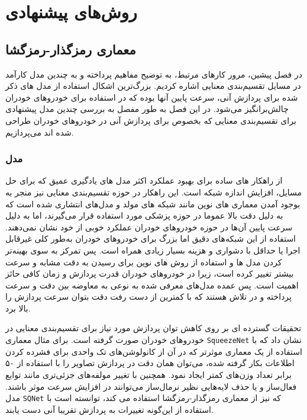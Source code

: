 \chapter{روش‌های پیشنهادی}

\section{معماری رمزگذار-رمزگشا}

در فصل پیشین، مرور کار‌های مرتبط، به توضیح مفاهیم پرداخته و به چندین مدل کارآمد در مسایل تقسیم‌بندی معنایی اشاره کردیم. بزرگ‌ترین اشکال استفاده از مدل های ذکر شده برای پردازش آنی، سرعت پایین آنها بوده که در استفاده برای خودرو‌های خودران چالش‌برانگیز می‌شود. در این فصل به طور مفصل به بررسی چندین مدل پیشنهادی برای تقسیم‌بندی معنایی که بخصوص برای پردازش آنی در خودرو‌های خودران طراحی شده اند می‌پردازیم.

\subsection{مدل }

از راهکار های ساده برای بهبود عملکرد اکثر مدل های یادگیری عمیق که برای حل مسایل، افزایش اندازه شبکه است. این راهکار در حوزه تقسیم‌بندی معنایی نیز منجر به بوجود آمدن معماری های نوین مانند شبکه های مولد
و مدل‌های انتشاری
شده است که به دلیل دقت بالا عموما در حوزه پزشکی مورد استفاده قرار می‌گیرند، اما به دلیل سرعت پایین آن‌ها در حوزه خودرو‌های خودران عملکرد خوبی از خود نشان نمی‌دهند. استفاده از این شبکه‌های دقیق اما بزرگ برای خودروهای خودران به‌طور کلی غیرقابل اجرا یا حداقل با دشواری و هزینه بسیار زیادی همراه است. پس تمرکز به سوی بهینه‌تر کردن مدل ها و استفاده از روش های نوین برای رسیدن به دقت مشابه و سرعت بیشتر تغییر کرده است، زیرا در خودرو‌های خودران قدرت پردازش و زمان کافی حائز اهمیت است. پس عمده مدل‌های معرفی شده به نوعی به معاوضه بین دقت و سرعت پرداخته و در تلاش هستند که با کمترین از دست رفت دقت بتوان سرعت پردازش را بالا برد.

تحقیقات گسترده ای بر روی کاهش توان پردازش مورد نیاز برای تقسیم‌بندی معنایی در خودرو‌های خودران صورت گرفته است. برای مثال معماری
\verb*|SqueezeNet|
\cite{iandola2016squeezenet}
نشان داد که با استفاده از یک معماری موثرتر که در آن از کانولوشن‌های تک واحدی برای فشرده کردن اطلاعات بکار گرفته شده، می‌توان همان دقت در پردازش تصاویر را با استفاده از ۵۰ برابر تعداد وزن‌های کمتر ایجاد نمود. همچنین با تغییر مولفه‌های جزئی‌تری مانند توابع ‌فعال‌ساز و یا حذف لایه‌هایی نظیر نرمال‌ساز می‌توانند در افزایش سرعت موثر باشند. مدل
\verb*|SQNet|
\cite{treml2016speeding}
که نیز از معماری رمزگذار-رمزگشا
استفاده می کند، توانسته است با استفاده از این‌گونه تغییرات به پردازش تقریبا آنی دست یابند.

